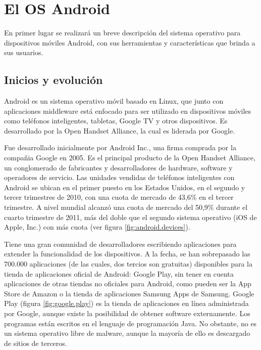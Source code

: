 \chapter{El \ac{OS} Android}

En primer lugar se realizar\'a un breve descripci\'on del sistema operativo para dispositivos m\'oviles Android, con sus herramientas y caracter\'isticas que brinda a sus usuarios.

\section{Inicios y evoluci\'on}
\label{sec:android.history.1}

Android es un sistema operativo m\'ovil basado en Linux, que junto con aplicaciones middleware est\'a enfocado para ser utilizado en dispositivos m\'oviles como tel\'efonos inteligentes, tabletas, Google TV y otros dispositivos. Es desarrollado por la Open Handset Alliance, la cual es liderada por Google\Si{\texttrademark}.

Fue desarrollado inicialmente por Android Inc., una firma comprada por la compa\~nia Google\Si{\texttrademark} en 2005. Es el principal producto de la Open Handset Alliance, un conglomerado de fabricantes y desarrolladores de hardware, software y operadores de servicio. Las unidades vendidas de tel\'efonos inteligentes con Android se ubican en el primer puesto en los Estados Unidos, en el segundo y tercer trimestres de 2010, con una cuota de mercado de 43,6\% en el tercer trimestre. A nivel mundial alcanz\'o una cuota de mercado del 50,9\% durante el cuarto trimestre de 2011, m\'as del doble que el segundo sistema operativo (iOS de Apple, Inc.) con m\'as cuota (ver figura \ref{fig:android.devices}).

Tiene una gran comunidad de desarrolladores escribiendo aplicaciones para extender la funcionalidad de los dispositivos. A la fecha, se han sobrepasado las 700.000 aplicaciones (de las cuales, dos tercios son gratuitas) disponibles para la tienda de aplicaciones oficial de Android: Google Play, sin tener en cuenta aplicaciones de otras tiendas no oficiales para Android, como pueden ser la App Store de Amazon o la tienda de aplicaciones Samsung Apps de Samsung. Google Play (figura \ref{fig:google.play}) es la tienda de aplicaciones en l\'inea administrada por Google, aunque existe la posibilidad de obtener software externamente. Los programas est\'an escritos en el lenguaje de programaci\'on Java. No obstante, no es un sistema operativo libre de malware, aunque la mayor\'ia de ello es descargado de sitios de terceros.

